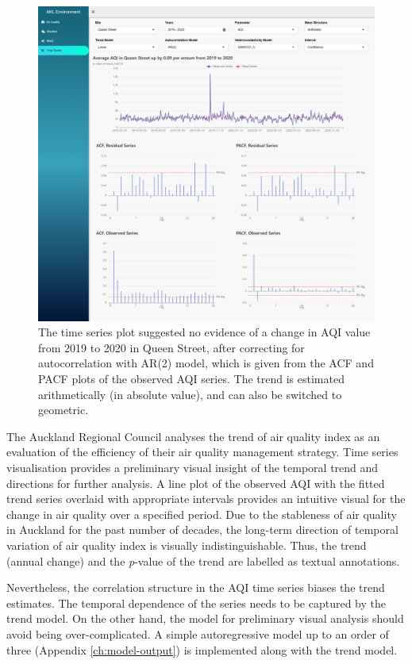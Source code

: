 \documentclass{aucklandthesis}
\begin{document}
\begin{figure}
\includegraphics[width=1\linewidth]{figures/ts-tab} \caption{The time series plot suggested no evidence of a change in AQI value from 2019 to 2020 in Queen Street, after correcting for autocorrelation with AR(2) model, which is given from the ACF and PACF plots of the observed AQI series. The trend is estimated arithmetically (in absolute value), and can also be switched to geometric.}\label{fig:unnamed-chunk-5}
\end{figure}



The Auckland Regional Council analyses the trend of air quality index as an evaluation of the efficiency of their air quality management strategy. Time series visualisation provides a preliminary visual insight of the temporal trend and directions for further analysis. A line plot of the observed AQI with the fitted trend series overlaid with appropriate intervals provides an intuitive visual for the change in air quality over a specified period. Due to the stableness of air quality in Auckland for the past number of decades, the long-term direction of temporal variation of air quality index is visually indistinguishable. Thus, the trend (annual change) and the \emph{p}-value of the trend are labelled as textual annotations.

Nevertheless, the correlation structure in the AQI time series biases the trend estimates. The temporal dependence of the series needs to be captured by the trend model. On the other hand, the model for preliminary visual analysis should avoid being over-complicated. A simple autoregressive model up to an order of three (Appendix \ref{ch:model-output}) is implemented along with the trend model.
\end{document}
